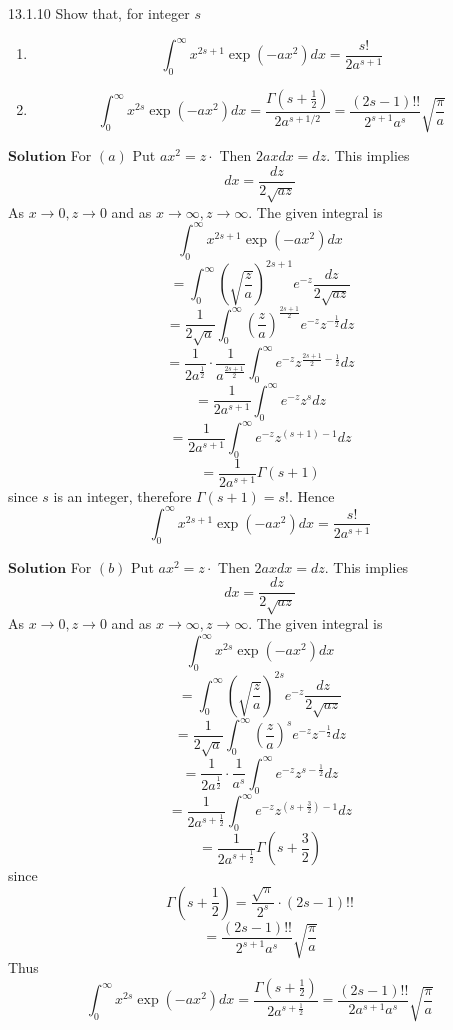 \documentclass{styles/kaobook}
\begin{document}
\begin{greenbox}{13.1.10}
Show that, for integer $s$
\begin{enumerate}[$(a)$]
\item $$\int_{0}^{\infty} x^{2 s+1} \exp \left(-a x^{2}\right) d x=\frac{s !}{2 a^{s+1}}$$
\item $$\int_{0}^{\infty} x^{2 s} \exp \left(-a x^{2}\right) d x=\frac{\Gamma\left(s+\frac{1}{2}\right)}{2 a^{s+1 / 2}}=\frac{(2 s-1) ! !}{2^{s+1} a^{s}} \sqrt{\frac{\pi}{a}}$$
\end{enumerate}


\end{greenbox}
$\boxed{\textbf{Solution}}$ For $(a)$ Put $a x^{2}=z \cdot$ Then $2 a x d x=d z$. This implies
$$
d x=\frac{d z}{2 \sqrt{a z}}
$$
As $x \rightarrow 0, z \rightarrow 0$ and as $x \rightarrow \infty, z \rightarrow \infty$.
The given integral is
$$
\int_{0}^{\infty} x^{2 s+1} \exp \left(-a x^{2}\right) d x
$$
$$
=\int_{0}^{\infty}\left(\sqrt{\frac{z}{a}}\right)^{2 s+1} e^{-z} \frac{d z}{2 \sqrt{a z}}
$$
$$
=\frac{1}{2 \sqrt{a}} \int_{0}^{\infty}\left(\frac{z}{a}\right)^{\frac{2 s+1}{2}} e^{-z} z^{-\frac{1}{2}} d z
$$
$$
=\frac{1}{2 a^{\frac{1}{2}}} \cdot \frac{1}{a^{\frac{2 s+1}{2}}} \int_{0}^{\infty} e^{-z} z^{\frac{2 s+1}{2}-\frac{1}{2}} d z
$$
$$
=\frac{1}{2 a^{s+1}} \int_{0}^{\infty} e^{-z} z^{s} d z
$$
$$
=\frac{1}{2 a^{s+1}} \int_{0}^{\infty} e^{-z} z^{(s+1)-1} d z
$$
$$
=\frac{1}{2 a^{s+1}} \Gamma(s+1)
$$
since $s$ is an integer, therefore $\Gamma(s+1)=s !$. Hence 
$$\int_{0}^{\infty} x^{2 s+1} \exp \left(-a x^{2}\right) d x=\frac{s !}{2 a^{s+1}}$$ 

$\boxed{\textbf{Solution}}$ For $(b)$ Put $a x^{2}=z \cdot$ Then $2 a x d x=d z$. This implies
$$
d x=\frac{d z}{2 \sqrt{a z}}
$$
As $x \rightarrow 0, z \rightarrow 0$ and as $x \rightarrow \infty, z \rightarrow \infty$.
The given integral is
$$
\int_{0}^{\infty} x^{2 s} \exp \left(-a x^{2}\right) d x
$$
$$
=\int_{0}^{\infty}\left(\sqrt{\frac{z}{a}}\right)^{2 s} e^{-z} \frac{d z}{2 \sqrt{a z}}
$$
$$
=\frac{1}{2 \sqrt{a}} \int_{0}^{\infty}\left(\frac{z}{a}\right)^{s} e^{-z} z^{-\frac{1}{2}} d z
$$
$$
=\frac{1}{2 a^{\frac{1}{2}}} \cdot \frac{1}{a^{s}} \int_{0}^{\infty} e^{-z} z^{s-\frac{1}{2}} d z
$$
$$
=\frac{1}{2 a^{s+\frac{1}{2}}} \int_{0}^{\infty} e^{-z} z^{\left(s+\frac{3}{2}\right)-1} d z
$$
$$
=\frac{1}{2 a^{s+\frac{1}{2}}} \Gamma\left(s+\frac{3}{2}\right)
$$
since 
$$\Gamma\left(s+\frac{1}{2}\right)=\frac{\sqrt{\pi}}{2^{s}} \cdot(2 s-1) ! !$$
$$
=\frac{(2 s-1) ! !}{2^{s+1} a^{s}} \sqrt{\frac{\pi}{a}}
$$
Thus
$$
\int_{0}^{\infty} x^{2 s} \exp \left(-a x^{2}\right) d x=\frac{\Gamma\left(s+\frac{1}{2}\right)}{2 a^{s+\frac{1}{2}}}=\frac{(2 s-1) ! !}{2 a^{s+1} a^{s}} \sqrt{\frac{\pi}{a}}
$$
\end{document}
